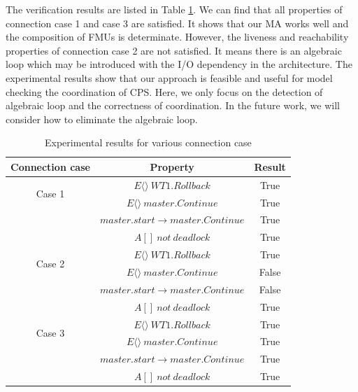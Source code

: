 The verification results are listed in Table \ref{rs}. We can find that all properties of connection case 1 and case 3 are satisfied. It shows that our MA works well and the composition of FMUs is determinate. However, the liveness and reachability properties of connection case 2 are not satisfied. It means there is an algebraic loop which may be introduced with the I/O dependency in the architecture. The experimental results show that our approach is feasible and useful for model checking the coordination of CPS. Here, we only focus on the detection of algebraic loop and the correctness of coordination. In the future work, we will consider how to eliminate the algebraic loop.  
\begin{table}
\caption{Experimental results for various connection case}
\centering
\begin{tabular}{c c c} 
        \hline  
        Connection case & Property & Result\\
        \hline
        \multirow{2}{2.0cm}{Case 1}  
                & $E\langle\rangle~WT1.Rollback$ & True\\ 
                & $E\langle\rangle~master.Continue$ & True\\ 
                & $master.start\rightarrow master.Continue$ & True\\ 
                & $A[]~not~deadlock$ & True\\   
        \hline 
        \multirow{2}{2.0cm}{Case 2}  
                & $E\langle\rangle~WT1.Rollback$ & True\\ 
                & $E\langle\rangle~master.Continue$ & False\\ 
                & $master.start\rightarrow master.Continue$ & False\\ 
                & $A[]~not~deadlock$ & True\\   
        \hline 
        \multirow{2}{2.0cm}{Case 3}  
                & $E\langle\rangle~WT1.Rollback$ & True\\ 
                & $E\langle\rangle~master.Continue$ & True\\ 
                & $master.start \rightarrow master.Continue$ & True\\ 
                & $A[]~not~deadlock$ & True\\   
        \hline 
\end{tabular} 
\label{rs}
\end{table}




